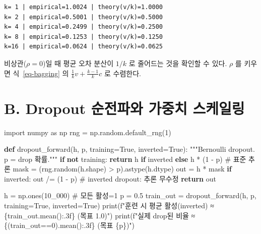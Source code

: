 \documentclass[
  letterpaper,
  DIV=11,
  numbers=noendperiod]{scrreprt}
\newenvironment{Shaded}{\begin{snugshade}}{\end{snugshade}}
\newcommand{\BuiltInTok}[1]{\textcolor[rgb]{0.00,0.23,0.31}{#1}}
\newcommand{\CommentTok}[1]{\textcolor[rgb]{0.37,0.37,0.37}{#1}}
\newcommand{\ControlFlowTok}[1]{\textcolor[rgb]{0.00,0.23,0.31}{\textbf{#1}}}
\newcommand{\DecValTok}[1]{\textcolor[rgb]{0.68,0.00,0.00}{#1}}
\newcommand{\FloatTok}[1]{\textcolor[rgb]{0.68,0.00,0.00}{#1}}
\newcommand{\ImportTok}[1]{\textcolor[rgb]{0.00,0.46,0.62}{#1}}
\newcommand{\KeywordTok}[1]{\textcolor[rgb]{0.00,0.23,0.31}{\textbf{#1}}}
\newcommand{\NormalTok}[1]{\textcolor[rgb]{0.00,0.23,0.31}{#1}}
\newcommand{\OperatorTok}[1]{\textcolor[rgb]{0.37,0.37,0.37}{#1}}
\newcommand{\SpecialCharTok}[1]{\textcolor[rgb]{0.37,0.37,0.37}{#1}}
\newcommand{\SpecialStringTok}[1]{\textcolor[rgb]{0.13,0.47,0.30}{#1}}
\newcommand{\VariableTok}[1]{\textcolor[rgb]{0.07,0.07,0.07}{#1}}
\begin{document}
\begin{verbatim}
k= 1 | empirical=1.0024 | theory(v/k)=1.0000
k= 2 | empirical=0.5001 | theory(v/k)=0.5000
k= 4 | empirical=0.2499 | theory(v/k)=0.2500
k= 8 | empirical=0.1253 | theory(v/k)=0.1250
k=16 | empirical=0.0624 | theory(v/k)=0.0625
\end{verbatim}

비상관(\(\rho=0\))일 때 평균 오차 분산이 \(1/k\) 로 줄어드는 것을 확인할
수 있다. \(\rho\) 를 키우면 식~\ref{eq-bagging} 의
\(\frac1k v+\frac{k-1}{k}c\) 로 수렴한다.

\section{B. Dropout 순전파와 가중치
스케일링}\label{b.-dropout-uxc21cuxc804uxd30cuxc640-uxac00uxc911uxce58-uxc2a4uxcf00uxc77cuxb9c1}

\begin{Shaded}
\begin{Highlighting}[]
\ImportTok{import}\NormalTok{ numpy }\ImportTok{as}\NormalTok{ np}
\NormalTok{rng }\OperatorTok{=}\NormalTok{ np.random.default\_rng(}\DecValTok{1}\NormalTok{)}

\KeywordTok{def}\NormalTok{ dropout\_forward(h, p, training}\OperatorTok{=}\VariableTok{True}\NormalTok{, inverted}\OperatorTok{=}\VariableTok{True}\NormalTok{):}
    \CommentTok{"""Bernoulli dropout. p = drop 확률."""}
    \ControlFlowTok{if} \KeywordTok{not}\NormalTok{ training:}
        \ControlFlowTok{return}\NormalTok{ h }\ControlFlowTok{if}\NormalTok{ inverted }\ControlFlowTok{else}\NormalTok{ h }\OperatorTok{*}\NormalTok{ (}\DecValTok{1} \OperatorTok{{-}}\NormalTok{ p)     }\CommentTok{\# 표준 추론}
\NormalTok{    mask }\OperatorTok{=}\NormalTok{ (rng.random(h.shape) }\OperatorTok{\textgreater{}}\NormalTok{ p).astype(h.dtype)}
\NormalTok{    out }\OperatorTok{=}\NormalTok{ h }\OperatorTok{*}\NormalTok{ mask}
    \ControlFlowTok{if}\NormalTok{ inverted:}
\NormalTok{        out }\OperatorTok{/=}\NormalTok{ (}\DecValTok{1} \OperatorTok{{-}}\NormalTok{ p)        }\CommentTok{\# inverted dropout: 추론 무수정}
    \ControlFlowTok{return}\NormalTok{ out}

\NormalTok{h }\OperatorTok{=}\NormalTok{ np.ones(}\DecValTok{10\_000}\NormalTok{)           }\CommentTok{\# 모든 활성=1}
\NormalTok{p }\OperatorTok{=} \FloatTok{0.5}
\NormalTok{train\_out }\OperatorTok{=}\NormalTok{ dropout\_forward(h, p, training}\OperatorTok{=}\VariableTok{True}\NormalTok{, inverted}\OperatorTok{=}\VariableTok{True}\NormalTok{)}
\BuiltInTok{print}\NormalTok{(}\SpecialStringTok{f"훈련 시 평균 활성(inverted) ≈ }\SpecialCharTok{\{}\NormalTok{train\_out}\SpecialCharTok{.}\NormalTok{mean()}\SpecialCharTok{:.3f\}}\SpecialStringTok{  (목표 1.0)"}\NormalTok{)}
\BuiltInTok{print}\NormalTok{(}\SpecialStringTok{f"실제 drop된 비율 ≈ }\SpecialCharTok{\{}\NormalTok{(train\_out}\OperatorTok{==}\DecValTok{0}\NormalTok{)}\SpecialCharTok{.}\NormalTok{mean()}\SpecialCharTok{:.3f\}}\SpecialStringTok{  (목표 }\SpecialCharTok{\{}\NormalTok{p}\SpecialCharTok{\}}\SpecialStringTok{)"}\NormalTok{)}
\end{Highlighting}
\end{Shaded}
\end{document}
